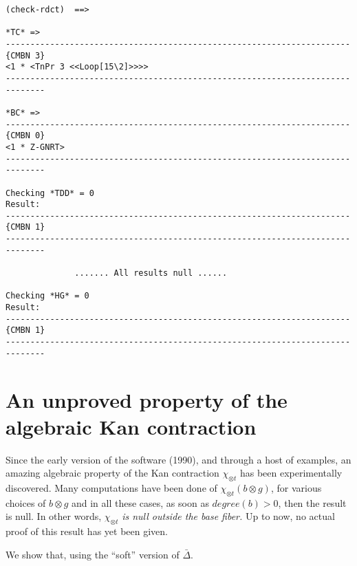{\begin{verbatim}
(check-rdct)  ==>

*TC* => 
----------------------------------------------------------------------{CMBN 3}
<1 * <TnPr 3 <<Loop[15\2]>>>>
------------------------------------------------------------------------------

*BC* => 
----------------------------------------------------------------------{CMBN 0}
<1 * Z-GNRT>
------------------------------------------------------------------------------

Checking *TDD* = 0
Result: 
----------------------------------------------------------------------{CMBN 1}
------------------------------------------------------------------------------

              ....... All results null ......

Checking *HG* = 0
Result: 
----------------------------------------------------------------------{CMBN 1}
------------------------------------------------------------------------------
\end{verbatim}}

\newpage

\section {An unproved property of the algebraic Kan contraction}

Since the early version of the software (1990), and through a host of examples, 
an amazing algebraic property of the Kan contraction $\chi_{\otimes t}$ has
been experimentally discovered. Many computations have been done of 
$\chi_{\otimes t}(b \otimes g)$, for various choices of $b \otimes g$
and in all these cases,  as soon as $degree(b) > 0$, then the result is null.
In other words,
$\chi_{\otimes t}$ {\em is null outside the base fiber.}
Up to now, no actual proof of this result has yet  been given. \par
We show that, using the ``soft'' version of $\bar{\Delta}$.

